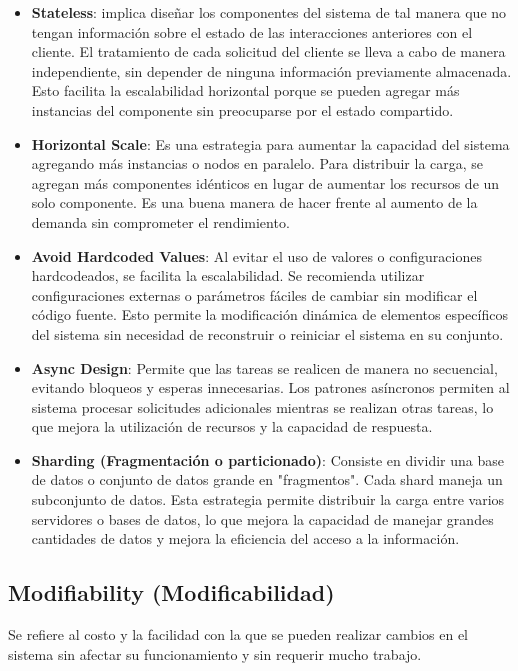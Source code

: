 \documentclass{article}
\begin{document}
		\begin{itemize}		
				\item \textbf{Stateless}\label{sec:escalabilidad_tacticas}: implica diseñar los componentes del sistema de tal manera que no tengan información sobre el estado de las interacciones anteriores con el cliente. El tratamiento de cada solicitud del cliente se lleva a cabo de manera independiente, sin depender de ninguna información previamente almacenada. Esto facilita la escalabilidad horizontal porque se pueden agregar más instancias del componente sin preocuparse por el estado compartido.
				
				\item \textbf{Horizontal Scale}: Es una estrategia para aumentar la capacidad del sistema agregando más instancias o nodos en paralelo. Para distribuir la carga, se agregan más componentes idénticos en lugar de aumentar los recursos de un solo componente. Es una buena manera de hacer frente al aumento de la demanda sin comprometer el rendimiento.
				
				\item \textbf{Avoid Hardcoded Values}: Al evitar el uso de valores o configuraciones hardcodeados, se facilita la escalabilidad. Se recomienda utilizar configuraciones externas o parámetros fáciles de cambiar sin modificar el código fuente. Esto permite la modificación dinámica de elementos específicos del sistema sin necesidad de reconstruir o reiniciar el sistema en su conjunto.
				
				
				\item \textbf{Async Design}: Permite que las tareas se realicen de manera no secuencial, evitando bloqueos y esperas innecesarias. Los patrones asíncronos permiten al sistema procesar solicitudes adicionales mientras se realizan otras tareas, lo que mejora la utilización de recursos y la capacidad de respuesta.
				
				\item \textbf{Sharding (Fragmentación o particionado)}: Consiste en dividir una base de datos o conjunto de datos grande en "fragmentos". Cada shard maneja un subconjunto de datos. Esta estrategia permite distribuir la carga entre varios servidores o bases de datos, lo que mejora la capacidad de manejar grandes cantidades de datos y mejora la eficiencia del acceso a la información.
			
		\end{itemize}
			
		\subsection{Modifiability \small{(Modificabilidad)} }
		Se refiere al costo y la facilidad con la que se pueden realizar cambios en el sistema sin afectar su funcionamiento y sin requerir mucho trabajo.
		 
\end{document}
